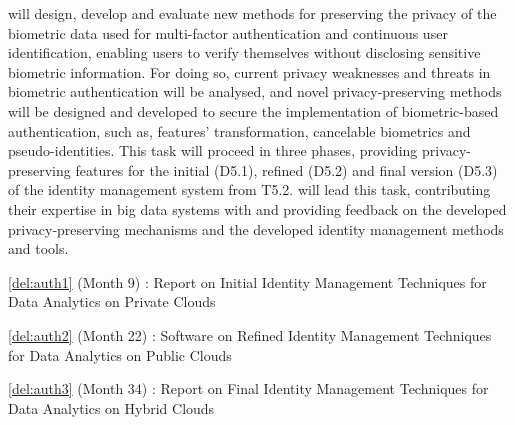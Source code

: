 \begin{Workpackage}{\thewpno}
\begin{Task}
\TaskResults{%
\ref{del:auth1},
\ref{del:auth2},
\ref{del:auth3}
}
\TaskHeader{}
\theTask{} will design, develop and evaluate new methods for preserving the privacy of the biometric data used for multi-factor authentication and continuous user identification, enabling users to verify themselves without disclosing sensitive biometric information. For doing so, current privacy weaknesses and threats in biometric authentication will be analysed, and novel privacy-preserving methods will be designed and developed to secure the implementation of biometric-based authentication, such as, features' transformation, cancelable biometrics and pseudo-identities. This task will proceed in three phases, providing privacy-preserving features for the initial (D5.1), refined (D5.2) and final version (D5.3) of the identity management system from T5.2. \UODshort{} will lead this task, contributing their expertise in big data systems with \FRQshort{} and \COGNIshort{} providing feedback on the developed privacy-preserving mechanisms and the developed identity management methods and tools.
\end{Task}


\begin{WPDeliverables}
  \begin{compactitem}
  \item \ref{del:auth1} (Month 9) : Report on Initial Identity Management Techniques for Data Analytics on Private Clouds
	\item \ref{del:auth2} (Month 22) : Software on Refined Identity Management Techniques for Data Analytics on Public Clouds
\item \ref{del:auth3} (Month 34) : Report on Final Identity Management Techniques for Data Analytics on Hybrid Clouds
\end{compactitem}
\end{WPDeliverables}
\end{Workpackage}
